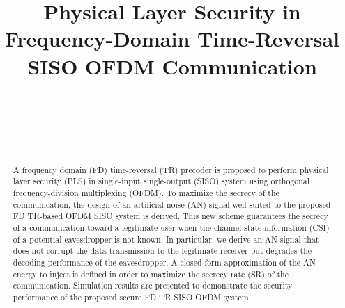 \documentclass[conference]{IEEEtran}
\begin{document}
\makecoverpage
\cleardoublepage
	
\title{Physical Layer Security in Frequency-Domain Time-Reversal SISO OFDM Communication}

\author{ \\
		 \\
		 \\
	
	 \\
	}
	\maketitle

\begin{abstract}
A frequency domain (FD) time-reversal (TR) precoder is proposed to perform physical layer security (PLS) in single-input single-output (SISO) system using orthogonal frequency-division multiplexing (OFDM). To maximize the secrecy of the communication, the design of an artificial noise (AN) signal well-suited to the proposed FD TR-based OFDM SISO system is derived. This new scheme guarantees the secrecy of a communication toward a legitimate user when the channel state information (CSI) of a potential eavesdropper is not known. In particular, we derive an AN signal that does not corrupt the data transmission to the legitimate receiver but degrades the decoding performance of the eavesdropper. A closed-form approximation of the AN energy to inject is defined in order to maximize the secrecy rate (SR) of the communication. Simulation results are presented to demonstrate the security performance of the proposed secure FD TR SISO OFDM system.
\end{abstract}
\end{document}
